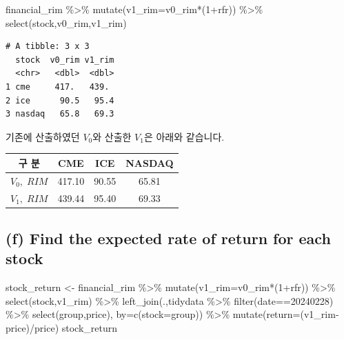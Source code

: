 \documentclass[
  letterpaper,
  DIV=11,
  numbers=noendperiod]{scrreprt}
\newenvironment{Shaded}{\begin{snugshade}}{\end{snugshade}}
\newcommand{\AttributeTok}[1]{\textcolor[rgb]{0.40,0.45,0.13}{#1}}
\newcommand{\DecValTok}[1]{\textcolor[rgb]{0.68,0.00,0.00}{#1}}
\newcommand{\FunctionTok}[1]{\textcolor[rgb]{0.28,0.35,0.67}{#1}}
\newcommand{\NormalTok}[1]{\textcolor[rgb]{0.00,0.23,0.31}{#1}}
\newcommand{\OtherTok}[1]{\textcolor[rgb]{0.00,0.23,0.31}{#1}}
\newcommand{\SpecialCharTok}[1]{\textcolor[rgb]{0.37,0.37,0.37}{#1}}
\newcommand{\StringTok}[1]{\textcolor[rgb]{0.13,0.47,0.30}{#1}}
\begin{document}
\begin{Shaded}
\begin{Highlighting}[]
\NormalTok{financial\_rim }\SpecialCharTok{\%\textgreater{}\%} 
  \FunctionTok{mutate}\NormalTok{(}\AttributeTok{v1\_rim=}\NormalTok{v0\_rim}\SpecialCharTok{*}\NormalTok{(}\DecValTok{1}\SpecialCharTok{+}\NormalTok{rfr)) }\SpecialCharTok{\%\textgreater{}\%} 
  \FunctionTok{select}\NormalTok{(stock,v0\_rim,v1\_rim)}
\end{Highlighting}
\end{Shaded}

\begin{verbatim}
# A tibble: 3 x 3
  stock  v0_rim v1_rim
  <chr>   <dbl>  <dbl>
1 cme     417.   439. 
2 ice      90.5   95.4
3 nasdaq   65.8   69.3
\end{verbatim}

기존에 산출하였던 \(V_0\)와 산출한 \(V_1\)은 아래와 같습니다.

\begin{longtable}[]{@{}cccc@{}}
\toprule\noalign{}
구 분 & CME & ICE & NASDAQ \\
\midrule\noalign{}
\endhead
\bottomrule\noalign{}
\endlastfoot
\(V_0,\; RIM\) & 417.10 & 90.55 & 65.81 \\
\(V_1,\; RIM\) & 439.44 & 95.40 & 69.33 \\
\end{longtable}

\subsection*{(f) Find the expected rate of return for each
stock}\label{f-find-the-expected-rate-of-return-for-each-stock}

\begin{Shaded}
\begin{Highlighting}[]
\NormalTok{stock\_return }\OtherTok{\textless{}{-}}\NormalTok{ financial\_rim }\SpecialCharTok{\%\textgreater{}\%} 
  \FunctionTok{mutate}\NormalTok{(}\AttributeTok{v1\_rim=}\NormalTok{v0\_rim}\SpecialCharTok{*}\NormalTok{(}\DecValTok{1}\SpecialCharTok{+}\NormalTok{rfr)) }\SpecialCharTok{\%\textgreater{}\%} 
  \FunctionTok{select}\NormalTok{(stock,v1\_rim) }\SpecialCharTok{\%\textgreater{}\%} 
  \FunctionTok{left\_join}\NormalTok{(.,tidydata }\SpecialCharTok{\%\textgreater{}\%} \FunctionTok{filter}\NormalTok{(date}\SpecialCharTok{==}\DecValTok{20240228}\NormalTok{) }\SpecialCharTok{\%\textgreater{}\%} \FunctionTok{select}\NormalTok{(group,price),}
            \AttributeTok{by=}\FunctionTok{c}\NormalTok{(}\StringTok{\textquotesingle{}stock\textquotesingle{}}\OtherTok{=}\StringTok{\textquotesingle{}group\textquotesingle{}}\NormalTok{)) }\SpecialCharTok{\%\textgreater{}\%} 
  \FunctionTok{mutate}\NormalTok{(}\AttributeTok{return=}\NormalTok{(v1\_rim}\SpecialCharTok{{-}}\NormalTok{price)}\SpecialCharTok{/}\NormalTok{price)}
\NormalTok{stock\_return}
\end{Highlighting}
\end{Shaded}
\end{document}
